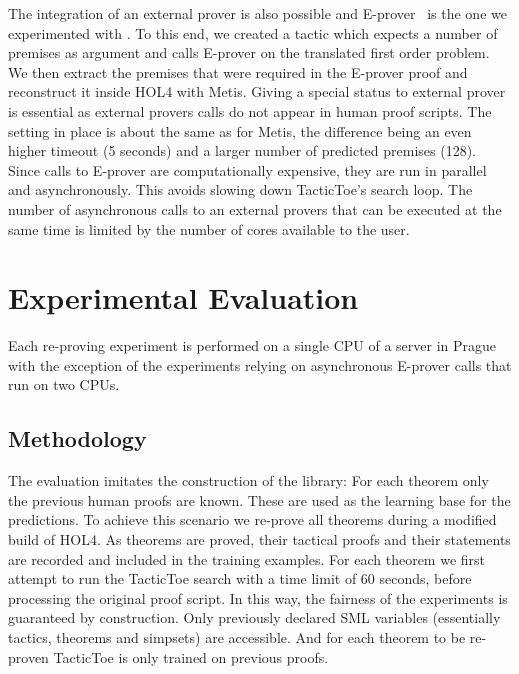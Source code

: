 \documentclass[runningheads,a4paper,draft]{svjour3}
\def\holfour{\textsf{HOL4}\xspace}
\def\eprover{\textsf{E-prover}\xspace}
\def\sml{\textsf{SML}\xspace}
\def\metis{\textsf{Metis}\xspace}
\def\tactictoe{\textsf{TacticToe}\xspace}
\begin{document}
The integration of an external prover is also possible and 
\eprover~\cite{eprover} is the one we experimented with .
To this end, we created a tactic which expects a number of premises as argument 
and calls \eprover on the translated first order problem. We then extract the
premises that were required in the \eprover 
proof and reconstruct it inside \holfour with \metis. Giving a special status 
to external 
prover is essential as external provers calls do not appear in human
proof scripts. The setting in place is about the same as for \metis, the 
difference being an even higher timeout (5 seconds) and a larger number of 
predicted premises (128). Since calls to \eprover are
computationally expensive, they are run in parallel and asynchronously. This 
avoids slowing down \tactictoe's search loop. The number of asynchronous calls 
to an external provers that can be executed at the same time is limited by the 
number of cores available to the user.


\section{Experimental Evaluation}\label{s:experiments}
Each re-proving experiment is performed on a single CPU of a server in Prague 
with the exception of the experiments 
relying on asynchronous \eprover calls that run on two CPUs.


\subsection{Methodology} 
The evaluation imitates the construction of the library: For each theorem only 
the previous human proofs are known. These are used as the learning base for 
the predictions.
To achieve this scenario we re-prove all theorems during a modified build of 
\holfour.
As theorems are proved, their tactical proofs and their statements are 
recorded and included in the training examples.
For each theorem we first attempt to run the \tactictoe search with a time 
limit of 60 seconds, before processing the original proof script.
In this way, the fairness of the experiments is guaranteed by construction. 
Only previously declared \sml 
variables (essentially tactics, theorems and simpsets) are accessible. 
And for each theorem to be re-proven \tactictoe is only trained on previous 
proofs.
\end{document}
